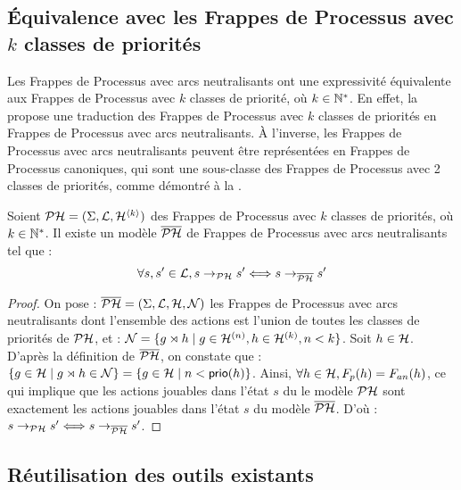 \subsection{Équivalence avec les Frappes de Processus avec $k$ classes de priorités}

Les Frappes de Processus avec arcs neutralisants ont une expressivité équivalente
aux Frappes de Processus avec $k$ classes de priorité, où $k \in \mathbb{N}^*$.
En effet, la  propose une traduction des Frappes de Processus
avec $k$ classes de priorités en Frappes de Processus avec arcs neutralisants.
À l'inverse, les Frappes de Processus avec arcs neutralisants peuvent être représentées
en Frappes de Processus canoniques, qui sont une sous-classe des Frappes de Processus avec
2 classes de priorités, comme démontré à la .

\begin{theorem}
  Soient $\mathcal{PH} = (\Sigma, \mathcal{L}, \mathcal{H}^{{\langle k \rangle}})$ des Frappes de Processus avec $k$ classes
  de priorités, où $k \in \mathbb{N}^*$.
  Il existe un modèle $\overline{\mathcal{PH}}$ de Frappes de Processus avec arcs neutralisants tel que :
  \[\forall s, s' \in \mathcal{L}, s \rightarrow_{\mathcal{PH}} s' \Longleftrightarrow s \rightarrow_{\overline{\mathcal{PH}}} s' \]
\end{theorem}

\begin{proof}
  On pose : $\overline{\mathcal{PH}} = (\Sigma, \mathcal{L}, \mathcal{H}, \mathcal{N})$ les Frappes de Processus avec arcs neutralisants
  dont l'ensemble des actions est l'union de toutes les classes de priorités de $\mathcal{PH}$, et :
  $\mathcal{N} = \{ g\rtimes h \mid g \in \mathcal{H}^{(n)}, h \in \mathcal{H}^{(k)}, n < k \}$.
  Soit $h \in \mathcal{H}$.
  D'après la définition de $\overline{\mathcal{PH}}$, on constate que :
  $\{ g \in \mathcal{H} \mid g\rtimes h \in \mathcal{N} \} = \{ g \in \mathcal{H} \mid n < \mathsf{prio}(h) \}$.
  Ainsi, $\forall h \in \mathcal{H}, F_{p}(h) = F_{an}(h)$,
  ce qui implique que les actions jouables dans l'état $s$ du le modèle $\mathcal{PH}$
  sont exactement les actions jouables dans l'état $s$ du modèle $\overline{\mathcal{PH}}$.
  D'où : $s \rightarrow_{\mathcal{PH}} s' \Longleftrightarrow s \rightarrow_{\overline{\mathcal{PH}}} s'$.
\end{proof}



\subsection{Réutilisation des outils existants}



